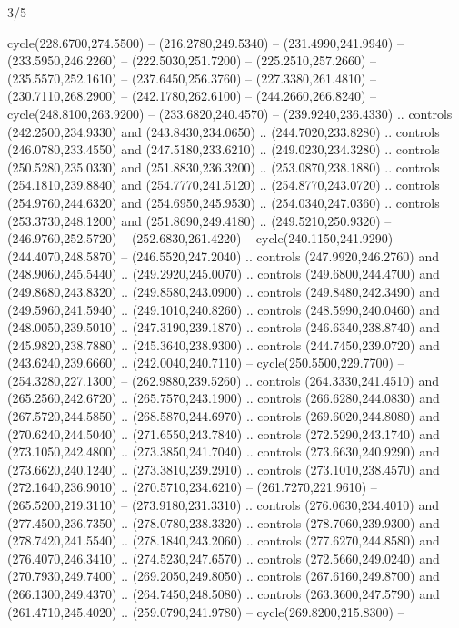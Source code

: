 \begin{flagdescription}{3/5}
\begin{scope} [xshift=0.5\flagwidth*\stretchfactor,yshift=0.5\flagwidth,scale=\flagwidth/391]
\begin{scope}[y=0.8pt, x=0.8pt, yscale=-1, xscale=1,line width=0.01\lw,shift={(-98.875,-338.125)}]
\begin{scope}[cm={{0.15382,0.0,0.0,0.15382,(34.72393,273.11413)}}]
  cycle(228.6700,274.5500) -- (216.2780,249.5340) -- (231.4990,241.9940) --
  (233.5950,246.2260) -- (222.5030,251.7200) -- (225.2510,257.2660) --
  (235.5570,252.1610) -- (237.6450,256.3760) -- (227.3380,261.4810) --
  (230.7110,268.2900) -- (242.1780,262.6100) -- (244.2660,266.8240) --
  cycle(248.8100,263.9200) -- (233.6820,240.4570) -- (239.9240,236.4330) ..
  controls (242.2500,234.9330) and (243.8430,234.0650) .. (244.7020,233.8280) ..
  controls (246.0780,233.4550) and (247.5180,233.6210) .. (249.0230,234.3280) ..
  controls (250.5280,235.0330) and (251.8830,236.3200) .. (253.0870,238.1880) ..
  controls (254.1810,239.8840) and (254.7770,241.5120) .. (254.8770,243.0720) ..
  controls (254.9760,244.6320) and (254.6950,245.9530) .. (254.0340,247.0360) ..
  controls (253.3730,248.1200) and (251.8690,249.4180) .. (249.5210,250.9320) --
  (246.9760,252.5720) -- (252.6830,261.4220) -- cycle(240.1150,241.9290) --
  (244.4070,248.5870) -- (246.5520,247.2040) .. controls (247.9920,246.2760) and
  (248.9060,245.5440) .. (249.2920,245.0070) .. controls (249.6800,244.4700) and
  (249.8680,243.8320) .. (249.8580,243.0900) .. controls (249.8480,242.3490) and
  (249.5960,241.5940) .. (249.1010,240.8260) .. controls (248.5990,240.0460) and
  (248.0050,239.5010) .. (247.3190,239.1870) .. controls (246.6340,238.8740) and
  (245.9820,238.7880) .. (245.3640,238.9300) .. controls (244.7450,239.0720) and
  (243.6240,239.6660) .. (242.0040,240.7110) -- cycle(250.5500,229.7700) --
  (254.3280,227.1300) -- (262.9880,239.5260) .. controls (264.3330,241.4510) and
  (265.2560,242.6720) .. (265.7570,243.1900) .. controls (266.6280,244.0830) and
  (267.5720,244.5850) .. (268.5870,244.6970) .. controls (269.6020,244.8080) and
  (270.6240,244.5040) .. (271.6550,243.7840) .. controls (272.5290,243.1740) and
  (273.1050,242.4800) .. (273.3850,241.7040) .. controls (273.6630,240.9290) and
  (273.6620,240.1240) .. (273.3810,239.2910) .. controls (273.1010,238.4570) and
  (272.1640,236.9010) .. (270.5710,234.6210) -- (261.7270,221.9610) --
  (265.5200,219.3110) -- (273.9180,231.3310) .. controls (276.0630,234.4010) and
  (277.4500,236.7350) .. (278.0780,238.3320) .. controls (278.7060,239.9300) and
  (278.7420,241.5540) .. (278.1840,243.2060) .. controls (277.6270,244.8580) and
  (276.4070,246.3410) .. (274.5230,247.6570) .. controls (272.5660,249.0240) and
  (270.7930,249.7400) .. (269.2050,249.8050) .. controls (267.6160,249.8700) and
  (266.1300,249.4370) .. (264.7450,248.5080) .. controls (263.3600,247.5790) and
  (261.4710,245.4020) .. (259.0790,241.9780) -- cycle(269.8200,215.8300) --

\end{scope}
\end{scope}
\end{scope}
\end{flagdescription}
